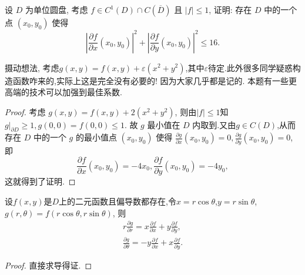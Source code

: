 \documentclass[../../main.tex]{subfiles}
\begin{document}
\begin{example}
设 \( D \) 为单位圆盘, 考虑 \( f \in C^1(D) \cap C(\overline{D}) \) 且 \( |f| \leqslant 1 \), 证明: 存在 \( D \) 中的一个点 \( (x_0, y_0) \) 使得
\[
\left| \frac{\partial f}{\partial x}(x_0, y_0) \right|^2 + \left| \frac{\partial f}{\partial y}(x_0, y_0) \right|^2 \leqslant 16 .
\]
\end{example}
\begin{note}
摄动想法, 考虑$g(x,y)=f(x,y)+\varepsilon (x^2+y^2)$,其中$\varepsilon$待定.此外很多同学疑惑构造函数咋来的,实际上这是完全没有必要的! 因为大家几乎都是记的. 本题有一些更高端的技术可以加强到最佳系数.
\end{note}
\begin{proof}
考虑 \( g(x, y) = f(x, y) + 2(x^2 + y^2) \), 则由$|f|\leqslant 1$知\( g|_{\partial D} \geqslant 1, g(0, 0)=f(0,0) \leqslant 1 \). 故 \( g \) 最小值在 \( D \) 内取到.又由$g\in C(D)$,从而存在 \( D \) 中的一个 \( g \) 的最小值点 \( (x_0, y_0) \) 使得 \( \frac{\partial g}{\partial x}(x_0, y_0) = 0, \frac{\partial g}{\partial y}(x_0, y_0) = 0 \), 即
\[
\frac{\partial f}{\partial x}(x_0, y_0) = -4x_0, \frac{\partial f}{\partial y}(x_0, y_0) = -4y_0,
\]
这就得到了证明.

\end{proof}

\begin{proposition}\label{proposition:极坐标变换偏导数相关结论}
设$f(x,y)$是$D$上的二元函数且偏导数都存在,令$x=r\cos \theta$,$y=r\sin \theta$,\( g(r, \theta) = f(r \cos \theta, r \sin \theta) \), 则
\begin{gather*}
r \frac{\partial g}{\partial r} = x \frac{\partial f}{\partial x} + y \frac{\partial f}{\partial y},
\\
\frac{\partial g}{\partial \theta} = -y \frac{\partial f}{\partial x} + x \frac{\partial f}{\partial y}.
\end{gather*}
\end{proposition}
\begin{proof}
直接求导得证.

\end{proof}
\end{document}
